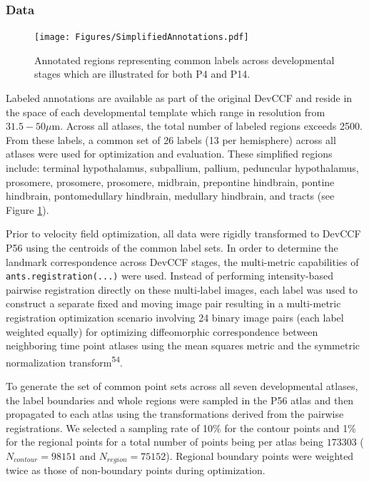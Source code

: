 \documentclass[
  12pt,
]{article}
\begin{document}
\subsubsection{Data}\label{data}

\begin{figure}[!htb]
\centering
\texttt{[image: Figures/SimplifiedAnnotations.pdf]}
\caption{Annotated regions representing common labels across developmental stages which
are illustrated for both P4 and P14.}
\label{fig:simplifiedannotations}
\end{figure}

Labeled annotations are available as part of the original DevCCF and
reside in the space of each developmental template which range in
resolution from \(31.5-50 \mu\)m. Across all atlases, the total number
of labeled regions exceeds 2500. From these labels, a common set of 26
labels (13 per hemisphere) across all atlases were used for optimization
and evaluation. These simplified regions include: terminal hypothalamus,
subpallium, pallium, peduncular hypothalamus, prosomere, prosomere,
prosomere, midbrain, prepontine hindbrain, pontine hindbrain,
pontomedullary hindbrain, medullary hindbrain, and tracts (see Figure
\ref{fig:simplifiedannotations}).

Prior to velocity field optimization, all data were rigidly transformed
to DevCCF P56 using the centroids of the common label sets. In order to
determine the landmark correspondence across DevCCF stages, the
multi-metric capabilities of \texttt{ants.registration(...)} were used.
Instead of performing intensity-based pairwise registration directly on
these multi-label images, each label was used to construct a separate
fixed and moving image pair resulting in a multi-metric registration
optimization scenario involving 24 binary image pairs (each label
weighted equally) for optimizing diffeomorphic correspondence between
neighboring time point atlases using the mean squares metric and the
symmetric normalization transform\textsuperscript{54}.

To generate the set of common point sets across all seven developmental
atlases, the label boundaries and whole regions were sampled in the P56
atlas and then propagated to each atlas using the transformations
derived from the pairwise registrations. We selected a sampling rate of
10\% for the contour points and 1\% for the regional points for a total
number of points being per atlas being \(173303\)
(\(N_{contour} = 98151\) and \(N_{region}=75152\)). Regional boundary
points were weighted twice as those of non-boundary points during
optimization.
\end{document}
